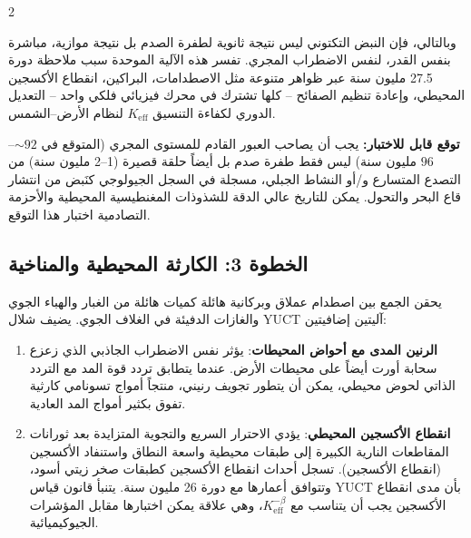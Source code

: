 \documentclass[11pt,a4paper]{article}
\begin{document}
	\begin{multicols}{2}
		
		وبالتالي، فإن النبض التكتوني ليس نتيجة ثانوية لطفرة الصدم بل نتيجة موازية، مباشرة بنفس القدر، لنفس الاضطراب المجري. تفسر هذه الآلية الموحدة سبب ملاحظة دورة 27.5 مليون سنة عبر ظواهر متنوعة مثل الاصطدامات، البراكين، انقطاع الأكسجين المحيطي، وإعادة تنظيم الصفائح – كلها تشترك في محرك فيزيائي فلكي واحد – التعديل الدوري لكفاءة التنسيق \(K_{\mathrm{eff}}\) لنظام الأرض–الشمس.
		
		\vspace{0.2cm}
		\noindent
		\textbf{توقع قابل للاختبار:} يجب أن يصاحب العبور القادم للمستوى المجري (المتوقع في \(\sim 92\)–\(96\) مليون سنة) ليس فقط طفرة صدم بل أيضاً حلقة قصيرة (1–2 مليون سنة) من التصدع المتسارع و/أو النشاط الجبلي، مسجلة في السجل الجيولوجي كنَبض من انتشار قاع البحر والتحول. يمكن للتاريخ عالي الدقة للشذوذات المغنطيسية المحيطية والأحزمة التصادمية اختبار هذا التوقع.
		
		\subsection{الخطوة 3: الكارثة المحيطية والمناخية}
		يحقن الجمع بين اصطدام عملاق وبركانية هائلة كميات هائلة من الغبار والهباء الجوي والغازات الدفيئة في الغلاف الجوي. يضيف شلال YUCT آليتين إضافيتين:
		\begin{enumerate}
			\item \textbf{الرنين المدى مع أحواض المحيطات}: يؤثر نفس الاضطراب الجاذبي الذي زعزع سحابة أورت أيضاً على محيطات الأرض. عندما يتطابق تردد قوة المد مع التردد الذاتي لحوض محيطي، يمكن أن يتطور تجويف رنيني، منتجاً أمواج تسونامي كارثية تفوق بكثير أمواج المد العادية.
			\item \textbf{انقطاع الأكسجين المحيطي}: يؤدي الاحترار السريع والتجوية المتزايدة بعد ثورانات المقاطعات النارية الكبيرة إلى طبقات محيطية واسعة النطاق واستنفاد الأكسجين (انقطاع الأكسجين). تسجل أحداث انقطاع الأكسجين كطبقات صخر زيتي أسود، وتتوافق أعمارها مع دورة 26 مليون سنة. يتنبأ قانون قياس YUCT بأن مدى انقطاع الأكسجين يجب أن يتناسب مع \(K_{\mathrm{eff}}^{-\beta}\)، وهي علاقة يمكن اختبارها مقابل المؤشرات الجيوكيميائية.
		\end{enumerate}
		

\end{multicols}
\end{document}
